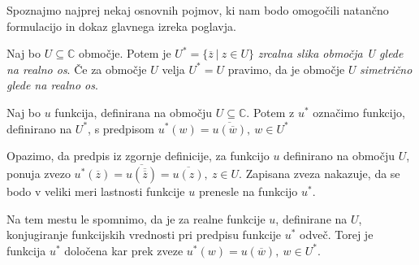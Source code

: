 \documentclass[mat1, tisk]{fmfdelo}
\begin{document}
    Spoznajmo najprej nekaj osnovnih pojmov, ki nam bodo omogočili natančno formulacijo in dokaz glavnega izreka poglavja.
    \begin{definicija}
        Naj bo $U \subseteq \mathbb{C}$ območje. Potem je $U^* = \{\overline{z}~|~z \in U\}$ \emph{zrcalna slika območja U glede na realno os}.
        Če za območje $U$ velja $U^* = U$ pravimo, da je območje $U$ \emph{simetrično glede na realno os}.
    \end{definicija}

    \begin{definicija}
        Naj bo $u$ funkcija, definirana na območju $U \subseteq \mathbb{C}$. Potem z \emph{$u^*$} označimo funkcijo, definirano na $U^*$, s predpisom $u^*(w) = \overline{u(\overline{w})},~w \in U^*$
    \end{definicija}

    Opazimo, da predpis iz zgornje definicije, za funkcijo $u$ definirano na območju $U$, ponuja zvezo $u^*(\overline{z}) = \overline{u(\overline{\overline{z}})} = \overline{u(z)},~z \in U$.
    Zapisana zveza nakazuje, da se bodo v veliki meri lastnosti funkcije $u$ prenesle na funkcijo $u^*$.

    \begin{opomba}
        Na tem mestu le spomnimo, da je za realne funkcije $u$, definirane na $U$, konjugiranje funkcijskih vrednosti pri predpisu funkcije $u^*$ odveč. Torej je funkcija $u^*$ določena kar prek zveze $u^*(w) = u(\overline{w}),~w \in U^*$.
    \end{opomba}
\end{document}
